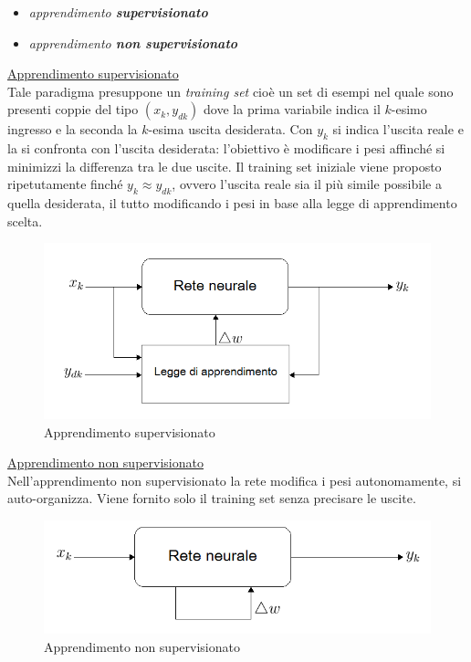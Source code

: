 \documentclass[12pt,a4paper,oneside]{book}
\begin{document}
		\begin{itemize}
			\item \emph{apprendimento \textbf{supervisionato} }
			\item \emph{apprendimento \textbf{non supervisionato}}
		\end{itemize}
	
		\underline{Apprendimento supervisionato}\\
		Tale paradigma presuppone un \emph{training set} cioè un set di esempi nel quale sono presenti coppie del tipo $(x_{k},y_{dk})$ dove la prima variabile indica il $k$-esimo ingresso e la seconda la $k$-esima uscita desiderata. Con $y_{k}$ si indica l'uscita reale e la si confronta con l'uscita desiderata: l'obiettivo è modificare i pesi affinché si minimizzi la differenza tra le due uscite. Il training set iniziale viene proposto ripetutamente finché $y_{k}\approx y_{dk}$, ovvero l'uscita reale sia il più simile possibile a quella desiderata, il tutto modificando i pesi in base alla legge di apprendimento scelta.\\
	
		\begin{figure}[h]
			\centering
			\includegraphics[width=0.8\linewidth]{IMMAGINI/supervisionato}
			\caption{ Apprendimento supervisionato }
			\label{fig:supervisionato}
		\end{figure}
		
		\clearpage
		\underline{Apprendimento non supervisionato}\\
		
		Nell'apprendimento non supervisionato la rete modifica i pesi autonomamente, si auto-organizza. Viene fornito solo il training set senza precisare le uscite.\\
	
		\begin{figure}[h]
			\centering
			\includegraphics[width=0.7\linewidth]{IMMAGINI/nonsupervisionato}
			\caption{ Apprendimento non supervisionato}
			\label{fig:nonsupervisionato}
		\end{figure}
	
\end{document}
